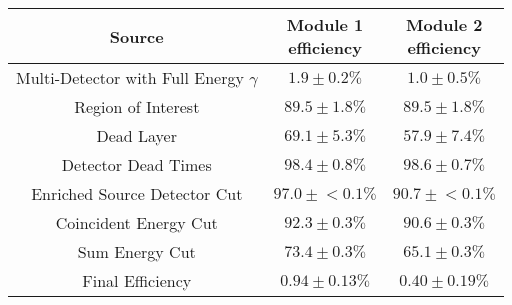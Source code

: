 \begin{tabular}{|c|c|c|}
\hline
  Source & \makecell{Module 1\\efficiency} & \makecell{Module 2\\efficiency} \\
\hline
  \makecell{Multi-Detector with\\Full Energy $\gamma$} & $1.9 \pm 0.2\%$ & $1.0 \pm 0.5\%$ \\
  Region of Interest & $89.5 \pm 1.8\%$ & $89.5 \pm 1.8\%$ \\
  Dead Layer & $69.1 \pm 5.3\%$ & $57.9 \pm 7.4\%$ \\
  Detector Dead Times & $98.4 \pm 0.8\%$ & $98.6 \pm 0.7\%$ \\
  Enriched Source Detector Cut & $97.0 \pm{}<\!0.1\%$ & $90.7 \pm{}<\!0.1\%$ \\
  Coincident Energy Cut & $92.3 \pm 0.3\%$ & $90.6 \pm 0.3\%$ \\
  Sum Energy Cut & $73.4 \pm 0.3\%$ & $65.1 \pm 0.3\%$ \\
  \hline Final Efficiency & $0.94 \pm 0.13\%$ & $0.40 \pm 0.19\%$ \\
\hline
\end{tabular}
